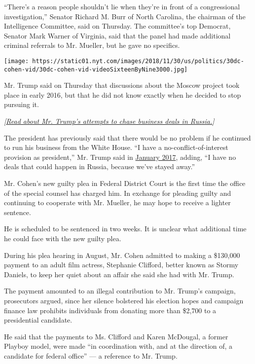 ``There's a reason people shouldn't lie when they're in front of a
congressional investigation,'' Senator Richard M. Burr of North
Carolina, the chairman of the Intelligence Committee, said on Thursday.
The committee's top Democrat, Senator Mark Warner of Virginia, said that
the panel had made additional criminal referrals to Mr. Mueller, but he
gave no specifics.

\texttt{[image: https://static01.nyt.com/images/2018/11/30/us/politics/30dc-cohen-vid/30dc-cohen-vid-videoSixteenByNine3000.jpg]}

Mr. Trump said on Thursday that discussions about the Moscow project
took place in early 2016, but that he did not know exactly when he
decided to stop pursuing it.

\emph{{[}}\href{https://www.nytimes.com/2017/01/16/us/politics/donald-trump-russia-business.html}{\emph{Read
about Mr. Trump's attempts to chase business deals in
Russia.}}\emph{{]}}

The president has previously said that there would be no problem if he
continued to run his business from the White House. ``I have a
no-conflict-of-interest provision as president,'' Mr. Trump said in
\href{https://www.nytimes.com/2017/01/11/us/politics/trump-press-conference-transcript.html}{January
2017}, adding, ``I have no deals that could happen in Russia, because
we've stayed away.''

Mr. Cohen's new guilty plea in Federal District Court is the first time
the office of the special counsel has charged him. In exchange for
pleading guilty and continuing to cooperate with Mr. Mueller, he may
hope to receive a lighter sentence.

He is scheduled to be sentenced in two weeks. It is unclear what
additional time he could face with the new guilty plea.

During his plea hearing in August, Mr. Cohen admitted to making a
\$130,000 payment to an adult film actress, Stephanie Clifford, better
known as Stormy Daniels, to keep her quiet about an affair she said she
had with Mr. Trump.

The payment amounted to an illegal contribution to Mr. Trump's campaign,
prosecutors argued, since her silence bolstered his election hopes and
campaign finance law prohibits individuals from donating more than
\$2,700 to a presidential candidate.

He said that the payments to Ms. Clifford and Karen McDougal, a former
Playboy model, were made ``in coordination with, and at the direction
of, a candidate for federal office'' --- a reference to Mr. Trump.

